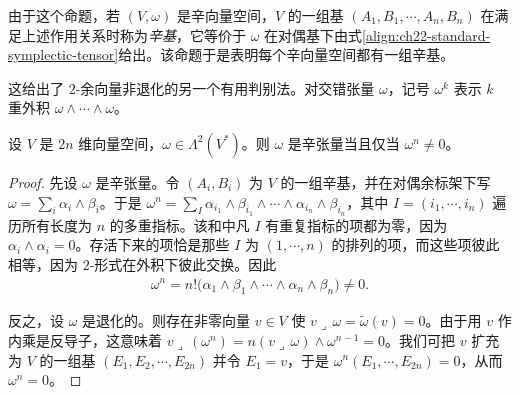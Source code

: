 \documentclass[../../main.tex]{subfiles}
\begin{document}
由于这个命题，若 $(V,\omega)$ 是辛向量空间，$V$ 的一组基 $(A_1,B_1,\cdots ,A_n,B_n)$ 在满足上述作用关系时称为\emph{辛基}，它等价于 $\omega$ 在对偶基下由式\eqref{align:ch22-standard-symplectic-tensor}给出。该命题于是表明每个辛向量空间都有一组辛基。

这给出了 $2$-余向量非退化的另一个有用判别法。对交错张量 $\omega$，记号 $\omega^k$ 表示 $k$ 重外积 $\omega\wedge\cdots\wedge\omega$。

\begin{proposition}\label{proposition:ch22-omega-nonzero}
设 $V$ 是 $2n$ 维向量空间，$\omega\in\Lambda^2(V^*)$。则 $\omega$ 是辛张量当且仅当 $\omega^n\neq0$。
\end{proposition}

\begin{proof}
先设 $\omega$ 是辛张量。令 $(A_i,B_i)$ 为 $V$ 的一组辛基，并在对偶余标架下写 $\omega=\sum_i\alpha_i\wedge\beta_i$。于是 $\omega^n=\sum_I\alpha_{i_1}\wedge\beta_{i_1}\wedge\cdots\wedge\alpha_{i_n}\wedge\beta_{i_n}$，其中 $I=(i_1,\cdots ,i_n)$ 遍历所有长度为 $n$ 的多重指标。该和中凡 $I$ 有重复指标的项都为零，因为 $\alpha_i\wedge\alpha_i=0$。存活下来的项恰是那些 $I$ 为 $(1,\cdots ,n)$ 的排列的项，而这些项彼此相等，因为 $2$-形式在外积下彼此交换。因此
\begin{align*}
\omega^n=n!\big(\alpha_1\wedge\beta_1\wedge\cdots\wedge\alpha_n\wedge\beta_n\big)\neq0.
\end{align*}

反之，设 $\omega$ 是退化的。则存在非零向量 $v\in V$ 使 $v\lrcorner\,\omega=\widetilde\omega(v)=0$。由于用 $v$ 作内乘是反导子，这意味着 $v\lrcorner\,(\omega^n)=n(v\lrcorner\,\omega)\wedge\omega^{n-1}=0$。我们可把 $v$ 扩充为 $V$ 的一组基 $(E_1,E_2,\cdots ,E_{2n})$ 并令 $E_1=v$，于是 $\omega^n(E_1,\cdots ,E_{2n})=0$，从而 $\omega^n=0$。
\end{proof}
\end{document}
